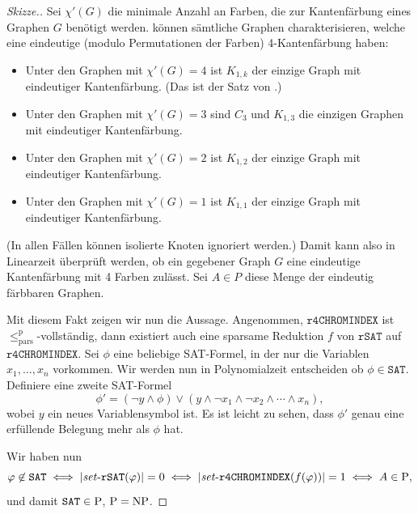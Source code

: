 \begin{proof}[Skizze.]
    Sei $\chi'(G)$ die minimale Anzahl an Farben, die zur Kantenfärbung eines Graphen $G$ benötigt werden.
    \citeauthor{cai_complexity_2020} können  
    sämtliche Graphen charakterisieren, welche eine eindeutige (modulo Permutationen der Farben) 4-Kantenfärbung haben:
    \begin{itemize}[nosep]
        \item Unter den Graphen mit $\chi'(G)=4$ ist $K_{1,k}$ der einzige Graph mit eindeutiger Kantenfärbung. (Das ist der Satz von \textcite{thomason_hamiltonian_1978}.)
        \item Unter den Graphen mit $\chi'(G)=3$ sind $C_3$ und $K_{1,3}$ die einzigen Graphen mit eindeutiger Kantenfärbung.
        \item Unter den Graphen mit $\chi'(G)=2$ ist $K_{1,2}$ der einzige Graph mit eindeutiger Kantenfärbung.
        \item Unter den Graphen mit $\chi'(G)=1$ ist $K_{1,1}$ der einzige Graph mit eindeutiger Kantenfärbung.
    \end{itemize}
    (In allen Fällen können isolierte Knoten ignoriert werden.)
    Damit kann also in Linearzeit überprüft werden, ob ein gegebener Graph $G$ eine eindeutige Kantenfärbung mit 4 Farben zulässt. Sei $A\in P$ diese Menge der eindeutig färbbaren Graphen.

    Mit diesem Fakt zeigen wir nun die Aussage.
    Angenommen, $\mathtt{r4CHROMINDEX}$ ist $\leq_\mathrm{pars}^\mathrm p$-vollständig, dann existiert auch eine sparsame Reduktion $f$ von $\mathtt{rSAT}$ auf $\mathtt{r4CHROMINDEX}$.
    Sei $\phi$ eine beliebige SAT-Formel, in der nur die Variablen $x_1, \dots, x_n$ vorkommen.
    Wir werden nun in Polynomialzeit entscheiden ob $\phi\in \mathtt{SAT}$. 
    Definiere eine zweite SAT-Formel
    \[ \phi' = (\neg y \land \phi) \lor (y\land \neg x_1 \land \neg x_2 \land\cdots\land x_n), \]
    wobei $y$ ein neues Variablensymbol ist. Es ist leicht zu sehen, dass $\phi'$ genau eine erfüllende Belegung mehr als $\phi$ hat.

    Wir haben nun
    \[ \phi\not\in\mathtt{SAT} \iff |\fset{}\mathtt{rSAT}(\phi)|=0 \iff |\fset{}\mathtt{r4CHROMINDEX}(f(\phi))|=1 \iff A\in \P, \]
    und damit $\mathtt{SAT}\in\P$, $\P=\NP$.
\end{proof}

